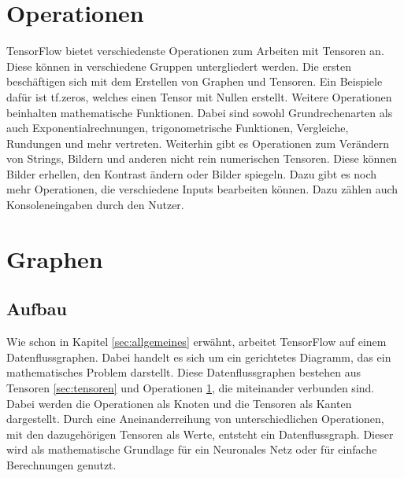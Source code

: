 \section{Operationen}
\label{sec:operationen}
\printsubchapterauthor{\authorMarco}
TensorFlow bietet verschiedenste Operationen zum Arbeiten mit Tensoren an. Diese können in verschiedene Gruppen untergliedert werden. Die ersten beschäftigen sich mit dem Erstellen von Graphen und Tensoren. Ein Beispiele dafür ist tf.zeros, welches einen Tensor mit Nullen erstellt. Weitere Operationen beinhalten mathematische Funktionen. Dabei sind sowohl Grundrechenarten als auch Exponentialrechnungen, trigonometrische Funktionen, Vergleiche, Rundungen und mehr vertreten. Weiterhin gibt es Operationen zum Verändern von Strings, Bildern und anderen nicht rein numerischen Tensoren. Diese können Bilder erhellen, den Kontrast ändern oder Bilder spiegeln. Dazu gibt es noch mehr Operationen, die verschiedene Inputs bearbeiten können. Dazu zählen auch Konsoleneingaben durch den Nutzer.

\section{Graphen}
\label{sec:graphen}
\printsubchapterauthor{\authorNiklas}
\subsection{Aufbau}
\label{sec:graphenAufbau}
Wie schon in Kapitel \ref{sec:allgemeines} erwähnt, arbeitet TensorFlow auf einem Datenflussgraphen. Dabei handelt es sich um ein gerichtetes Diagramm, das ein mathematisches Problem darstellt. Diese Datenflussgraphen bestehen aus Tensoren \ref{sec:tensoren} und Operationen \ref{sec:operationen}, die miteinander verbunden sind. Dabei werden die Operationen als Knoten und die Tensoren als Kanten dargestellt. Durch eine Aneinanderreihung von unterschiedlichen Operationen, mit den dazugehörigen Tensoren als Werte, entsteht ein Datenflussgraph. Dieser wird als mathematische Grundlage für ein Neuronales Netz oder für einfache Berechnungen genutzt.


